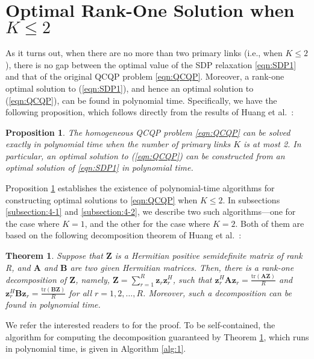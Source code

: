 \documentclass[twocolumn,10pt]{IEEEtran}
\theoremstyle{plain} \newtheorem{theorem}{Theorem}
\theoremstyle{plain} \newtheorem{proposition}{Proposition}
\theoremstyle{plain} \newtheorem{corollary}{Corollary}
\theoremstyle{remark} \newtheorem{remark}{Remark}
\theoremstyle{remark} \newtheorem{lemma}{Lemma}
\theoremstyle{plain} \newtheorem{definition}{Definition}
\theoremstyle{plain} \newtheorem{assumption}{Assumption}
\theoremstyle{plain} \newtheorem{fact}{Fact}
\begin{document}
\section{Optimal Rank-One Solution when $K\leq2$}\label{sec:exact}
As it turns out, when there are no more than two primary links (i.e., when $K\le2$), there is no gap between the optimal value of the SDP relaxation \eqref{eqn:SDP1} and that of the original QCQP problem \eqref{eqn:QCQP}.  Moreover, a rank-one optimal solution to (\ref{eqn:SDP1}), and hence an optimal solution to (\ref{eqn:QCQP}), can be found in polynomial time.  Specifically, we have the following proposition, which follows directly from the results of Huang et al.~\cite{HZ07,HdMZ10}:
\begin{proposition}\label{pro:nogap}
The homogeneous QCQP problem \eqref{eqn:QCQP} can be solved exactly in polynomial time when the number of primary links $K$ is at most 2. In particular, an optimal solution to (\ref{eqn:QCQP}) can be constructed from an optimal solution of \eqref{eqn:SDP1} in polynomial time.
\end{proposition}
Proposition \ref{pro:nogap} establishes the existence of polynomial-time algorithms for constructing optimal solutions to \eqref{eqn:QCQP} when $K\leq 2$.  In subsections \ref{subsection:4-1} and \ref{subsection:4-2}, we describe two such algorithms---one for the case where $K=1$, and the other for the case where $K=2$.  Both of them are based on the following decomposition theorem of Huang et al.~\cite{HZ07,HdMZ10}:
\begin{theorem}\label{thm:decompose}
Suppose that $\mathbf{Z}$ is a Hermitian positive semidefinite matrix of rank R, and $\mathbf{A}$ and $\mathbf{B}$ are two given Hermitian matrices. Then, there is a rank-one decomposition of $\mathbf{Z}$, namely, $\mathbf{Z}=\sum_{r=1}^R \mathbf{z}_r\mathbf{z}_r^H$, such that $\mathbf{z}_r^H\mathbf{A}\mathbf{z}_r=\frac{\mathrm{tr}(\mathbf{AZ})}{R}$ and $\mathbf{z}_r^H\mathbf{B}\mathbf{z}_r=\frac{\mathrm{tr}(\mathbf{BZ})}{R}$ for all $r=1,2,\ldots,R$.  Moreover, such a decomposition can be found in polynomial time.
\end{theorem}
We refer the interested readers to \cite{HdMZ10} for the proof. To be self-contained, the algorithm for computing the decomposition guaranteed by Theorem \ref{thm:decompose}, which runs in polynomial time, is given in Algorithm \ref{alg:1}.
\end{document}
